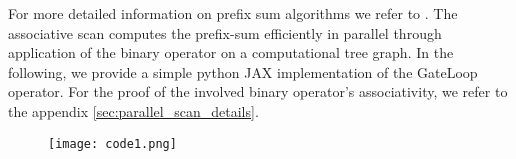 \documentclass{article} \usepackage{iclr2024_conference,times}
\begin{document}
For more detailed information on prefix sum algorithms we refer to \cite{beloch90}. The associative scan computes the prefix-sum efficiently in parallel through application of the binary operator on a computational tree graph. In the following, we provide a simple python JAX implementation of the GateLoop operator. For the proof of the involved binary operator's associativity, we refer to the appendix \ref{sec:parallel_scan_details}.

\begin{figure}[H]
    \centering
    \texttt{[image: code1.png]}
\end{figure}







\newpage
\end{document}
